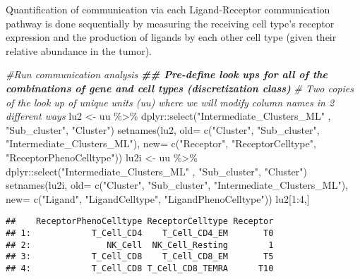 \documentclass[
]{article}
\newenvironment{Shaded}{\begin{snugshade}}{\end{snugshade}}
\newcommand{\AttributeTok}[1]{\textcolor[rgb]{0.77,0.63,0.00}{#1}}
\newcommand{\CommentTok}[1]{\textcolor[rgb]{0.56,0.35,0.01}{\textit{#1}}}
\newcommand{\DecValTok}[1]{\textcolor[rgb]{0.00,0.00,0.81}{#1}}
\newcommand{\DocumentationTok}[1]{\textcolor[rgb]{0.56,0.35,0.01}{\textbf{\textit{#1}}}}
\newcommand{\FunctionTok}[1]{\textcolor[rgb]{0.00,0.00,0.00}{#1}}
\newcommand{\NormalTok}[1]{#1}
\newcommand{\OtherTok}[1]{\textcolor[rgb]{0.56,0.35,0.01}{#1}}
\newcommand{\SpecialCharTok}[1]{\textcolor[rgb]{0.00,0.00,0.00}{#1}}
\newcommand{\StringTok}[1]{\textcolor[rgb]{0.31,0.60,0.02}{#1}}
\begin{document}
Quantification of communication via each Ligand-Receptor communication
pathway is done sequentially by measuring the receiving cell type's
receptor expression and the production of ligands by each other cell
type (given their relative abundance in the tumor).

\begin{Shaded}
\begin{Highlighting}[]
\CommentTok{\#Run communication analysis}
\DocumentationTok{\#\# Pre{-}define look ups for all of the combinations of gene and cell types (discretization class) }
\CommentTok{\# Two copies of the look up of unique units (uu) where we will modify column names in 2 different ways}
\NormalTok{lu2 }\OtherTok{\textless{}{-}}\NormalTok{ uu }\SpecialCharTok{\%\textgreater{}\%}\NormalTok{ dplyr}\SpecialCharTok{::}\FunctionTok{select}\NormalTok{(}\StringTok{"Intermediate\_Clusters\_ML"}\NormalTok{ , }\StringTok{"Sub\_cluster"}\NormalTok{, }\StringTok{"Cluster"}\NormalTok{)}
\FunctionTok{setnames}\NormalTok{(lu2, }\AttributeTok{old=} \FunctionTok{c}\NormalTok{(}\StringTok{"Cluster"}\NormalTok{, }\StringTok{"Sub\_cluster"}\NormalTok{, }\StringTok{"Intermediate\_Clusters\_ML"}\NormalTok{), }\AttributeTok{new=} \FunctionTok{c}\NormalTok{(}\StringTok{"Receptor"}\NormalTok{, }\StringTok{"ReceptorCelltype"}\NormalTok{, }\StringTok{"ReceptorPhenoCelltype"}\NormalTok{))}
\NormalTok{lu2i }\OtherTok{\textless{}{-}}\NormalTok{ uu }\SpecialCharTok{\%\textgreater{}\%}\NormalTok{ dplyr}\SpecialCharTok{::}\FunctionTok{select}\NormalTok{(}\StringTok{"Intermediate\_Clusters\_ML"}\NormalTok{ , }\StringTok{"Sub\_cluster"}\NormalTok{, }\StringTok{"Cluster"}\NormalTok{)}
\FunctionTok{setnames}\NormalTok{(lu2i, }\AttributeTok{old=} \FunctionTok{c}\NormalTok{(}\StringTok{"Cluster"}\NormalTok{, }\StringTok{"Sub\_cluster"}\NormalTok{, }\StringTok{"Intermediate\_Clusters\_ML"}\NormalTok{), }\AttributeTok{new=} \FunctionTok{c}\NormalTok{(}\StringTok{"Ligand"}\NormalTok{, }\StringTok{"LigandCelltype"}\NormalTok{, }\StringTok{"LigandPhenoCelltype"}\NormalTok{))}
\NormalTok{lu2[}\DecValTok{1}\SpecialCharTok{:}\DecValTok{4}\NormalTok{,]}
\end{Highlighting}
\end{Shaded}

\begin{verbatim}
##    ReceptorPhenoCelltype ReceptorCelltype Receptor
## 1:            T_Cell_CD4    T_Cell_CD4_EM       T0
## 2:               NK_Cell  NK_Cell_Resting        1
## 3:            T_Cell_CD8    T_Cell_CD8_EM       T5
## 4:            T_Cell_CD8 T_Cell_CD8_TEMRA      T10
\end{verbatim}
\end{document}
